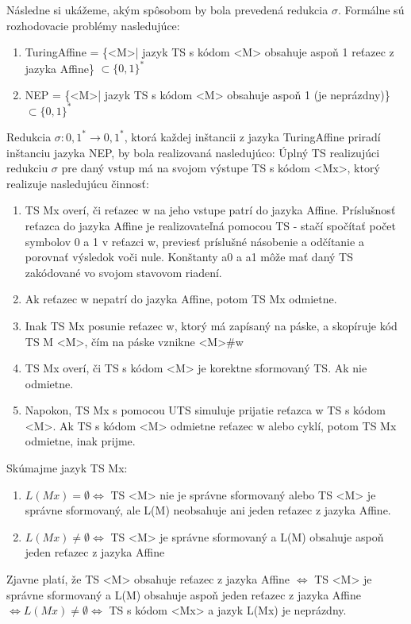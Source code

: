 \documentclass[10pt]{article}
\begin{document}
Následne si ukážeme, akým spôsobom by bola prevedená redukcia $\sigma$.
Formálne sú rozhodovacie problémy nasledujúce:
\begin{enumerate}
    \item TuringAffine = \{<M>| jazyk TS s kódom <M> obsahuje aspoň 1 reťazec z jazyka Affine\}
        $\subset \{0,1\}^*$ 
    \item NEP = \{<M>| jazyk TS s kódom <M> obsahuje aspoň 1 (je neprázdny)\} $\subset \{0,1\}^*$ 
\end{enumerate}

Redukcia $\sigma: {0,1}^* \to {0,1}^*$, ktorá každej inštancii z jazyka TuringAffine priradí
inštanciu jazyka NEP, by bola realizovaná nasledujúco:
Úplný TS realizujúci redukciu $\sigma$ pre daný vstup má na svojom výstupe TS s kódom <Mx>, ktorý
realizuje nasledujúcu činnosť:
\begin{enumerate}
    \item TS Mx overí, či reťazec w na jeho vstupe patrí do jazyka Affine. Príslušnosť reťazca do
        jazyka Affine je realizovateľná pomocou TS - stačí spočítať počet symbolov 0 a 1 v reťazci
        w, previesť príslušné násobenie a odčítanie a porovnať výsledok voči nule. Konštanty
        a0 a a1 môže mať daný TS zakódované vo svojom stavovom riadení.
    \item Ak reťazec w nepatrí do jazyka Affine, potom TS Mx odmietne.
    \item Inak TS Mx posunie reťazec w, ktorý má zapísaný na páske, a skopíruje kód
        TS M <M>, čím na páske vznikne <M>\#w
    \item TS Mx overí, či TS s kódom <M> je korektne sformovaný TS. Ak nie odmietne.
    \item Napokon, TS Mx s pomocou UTS simuluje prijatie reťazca w TS s kódom <M>. Ak TS s kódom <M>
        odmietne reťazec w alebo cyklí, potom TS Mx odmietne, inak prijme.
\end{enumerate}
Skúmajme jazyk TS Mx:
\begin{enumerate}
    \item $L(Mx) = \emptyset \iff$ TS <M> nie je správne sformovaný alebo TS <M> je správne
        sformovaný, ale L(M) neobsahuje ani jeden reťazec z jazyka Affine.
    \item $L(Mx) \neq \emptyset \iff$ TS <M> je správne sformovaný a L(M) obsahuje aspoň jeden reťazec
        z jazyka Affine
\end{enumerate}

Zjavne platí, že TS <M> obsahuje reťazec z jazyka Affine $\iff$ TS <M> je správne sformovaný a L(M)
obsahuje aspoň jeden reťazec z jazyka Affine $\iff L(Mx) \neq \emptyset \iff$ TS s kódom <Mx> a
jazyk L(Mx) je neprázdny.
\end{document}
